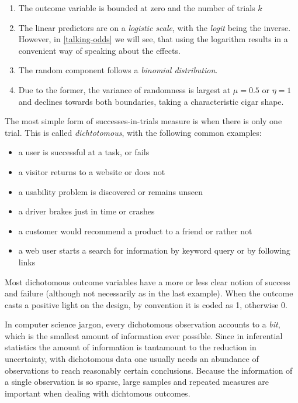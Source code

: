 \documentclass[]{svmono}
\providecommand{\tightlist}{%
  \setlength{\itemsep}{0pt}\setlength{\parskip}{0pt}}
\begin{document}
\begin{enumerate}
\def\labelenumi{\arabic{enumi}.}
\tightlist
\item
  The outcome variable is bounded at zero and the number of trials \(k\)
\item
  The linear predictors are on a \emph{logistic scale}, with the
  \emph{logit} being the inverse. However, in \ref{talking-odds} we will
  see, that using the logarithm results in a convenient way of speaking
  about the effects.
\item
  The random component follows a \emph{binomial distribution}.
\item
  Due to the former, the variance of randomness is largest at
  \(\mu = 0.5\) or \(\eta = 1\) and declines towards both boundaries,
  taking a characteristic cigar shape.
\end{enumerate}

The most simple form of successes-in-trials measure is when there is
only one trial. This is called \emph{dichtotomous}, with the following
common examples:

\begin{itemize}
\tightlist
\item
  a user is successful at a task, or fails
\item
  a visitor returns to a website or does not
\item
  a usability problem is discovered or remains unseen
\item
  a driver brakes just in time or crashes
\item
  a customer would recommend a product to a friend or rather not
\item
  a web user starts a search for information by keyword query or by
  following links
\end{itemize}

Most dichotomous outcome variables have a more or less clear notion of
success and failure (although not necessarily as in the last example).
When the outcome casts a positive light on the design, by convention it
is coded as 1, otherwise 0.

In computer science jargon, every dichotomous observation accounts to a
\emph{bit}, which is the smallest amount of information ever possible.
Since in inferential statistics the amount of information is tantamount
to the reduction in uncertainty, with dichotomous data one usually needs
an abundance of observations to reach reasonably certain conclusions.
Because the information of a single observation is so sparse, large
samples and repeated measures are important when dealing with dichtomous
outcomes.
\end{document}
